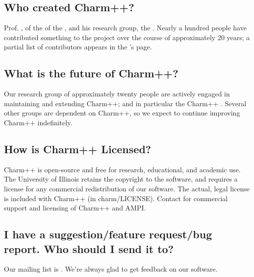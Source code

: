 \subsection{Who created Charm++?}

Prof. , of the
of the ,
and his research group, the .
Nearly a hundred people have contributed something
to the project over the course of approximately 20 years; a partial list
of contributors appears in the 's page.

\subsection{What is the future of Charm++?}

Our research group of approximately twenty people are actively engaged
in maintaining and extending Charm++; and in particular the Charm++ 
.
Several other groups are dependent on Charm++, so we expect to continue
improving Charm++ indefinitely.

\subsection{How is Charm++ Licensed?}

Charm++ is open-source and free for research, educational, and academic
use. The University of Illinois retains the copyright to the software,
and requires a license for any commercial redistribution of our software.
The actual, legal license is included with Charm++ (in charm/LICENSE).
Contact 
for commercial support and licensing of Charm++ and AMPI.

\subsection{I have a suggestion/feature request/bug report. Who should I send
it to?}

Our mailing list is .
We're always glad to get feedback on our software.
